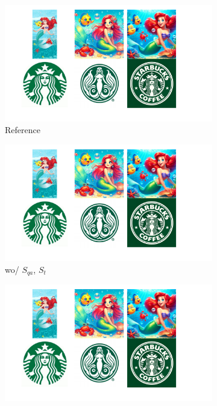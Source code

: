 
\begin{figure}
    \centering
    \vspace{-0.12in}
        \begin{subfigure}[t]{0.32\linewidth}
            \centering
            \includegraphics[width=\linewidth]{figure_folder/ablation_ref.pdf}
            \vspace{-0.2in}
            \caption{\small Reference}
            \label{figa:ablation_ref}
        \end{subfigure}
        \hfill
        \begin{subfigure}[t]{0.32\linewidth}
            \centering
            \includegraphics[width=\linewidth]{figure_folder/ablation_ab.pdf}
            \vspace{-0.2in}
            \caption{\small wo/ $S_{qa}$, $S_{t}$}
            \label{figb:ablation_ab}
        \end{subfigure}
        \hfill
        \begin{subfigure}[t]{0.32\linewidth}
            \centering
            \includegraphics[width=\linewidth]{figure_folder/ablation_ours.pdf}

\end{subfigure}
\end{figure}

